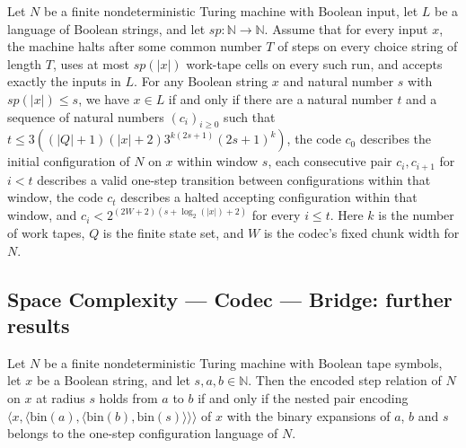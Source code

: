 \begin{theorem}
\label{Complexity.Codec.mem_iff_codeChain}
\leanok
{}
Let $N$ be a finite nondeterministic Turing machine with Boolean input, let $L$ be a
language of Boolean strings, and let $sp:\mathbb{N}\to\mathbb{N}$. Assume that for every
input $x$, the machine halts after some common number $T$ of steps on every choice
string of length $T$, uses at most $sp(|x|)$ work-tape cells on every such run, and
accepts exactly the inputs in $L$. For any Boolean string $x$ and natural number $s$
with $sp(|x|)\le s$, we have $x\in L$ if and only if there are a natural number $t$ and
a sequence of natural numbers $(c_i)_{i\ge0}$ such that $t\le
3((|Q|+1)(|x|+2)3^{k(2s+1)}(2s+1)^k)$, the code $c_0$ describes the initial
configuration of $N$ on $x$ within window $s$, each consecutive pair $c_i,c_{i+1}$ for
$i<t$ describes a valid one-step transition between configurations within that window,
the code $c_t$ describes a halted accepting configuration within that window, and
$c_i<2^{(2W+2)(s+\log_2(|x|)+2)}$ for every $i\le t$. Here $k$ is the number of work
tapes, $Q$ is the finite state set, and $W$ is the codec's fixed chunk width for $N$.
\end{theorem}

\subsection*{Space Complexity --- Codec --- Bridge: further results}

\begin{theorem}
\label{Complexity.Codec.stepRel_iff_mem}
\leanok
{}
Let $N$ be a finite nondeterministic Turing machine with Boolean tape symbols, let $x$
be a Boolean string, and let $s,a,b\in\mathbb{N}$. Then the encoded step relation of $N$
on $x$ at radius $s$ holds from $a$ to $b$ if and only if the nested pair encoding
$\langle x,\langle\mathrm{bin}(a),\langle\mathrm{bin}(b),\mathrm{bin}(s)\rangle\rangle\rangle$
of $x$ with the binary expansions of $a$, $b$ and $s$ belongs to the one-step
configuration language of $N$.
\end{theorem}
